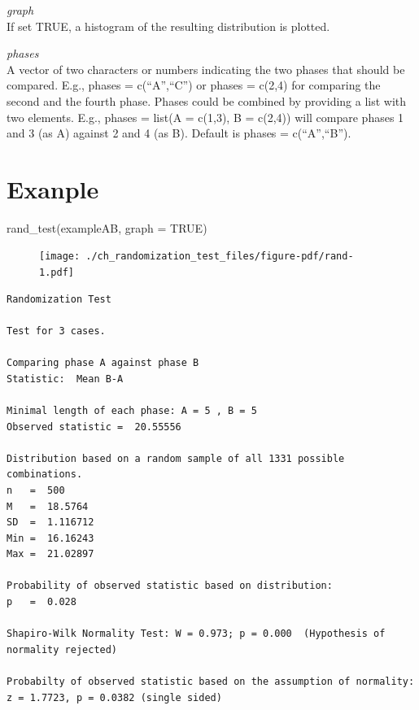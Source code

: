 \documentclass[
  letterpaper,
  DIV=11,
  numbers=noendperiod]{scrreprt}
\newenvironment{Shaded}{\begin{snugshade}}{\end{snugshade}}
\newcommand{\AttributeTok}[1]{\textcolor[rgb]{0.40,0.45,0.13}{#1}}
\newcommand{\ConstantTok}[1]{\textcolor[rgb]{0.56,0.35,0.01}{#1}}
\newcommand{\FunctionTok}[1]{\textcolor[rgb]{0.28,0.35,0.67}{#1}}
\newcommand{\NormalTok}[1]{\textcolor[rgb]{0.00,0.23,0.31}{#1}}
\begin{document}
\emph{graph}\\
If set TRUE, a histogram of the resulting distribution is plotted.

\emph{phases}\\
A vector of two characters or numbers indicating the two phases that
should be compared. E.g., phases = c(``A'',``C'') or phases = c(2,4) for
comparing the second and the fourth phase. Phases could be combined by
providing a list with two elements. E.g., phases = list(A = c(1,3), B =
c(2,4)) will compare phases 1 and 3 (as A) against 2 and 4 (as B).
Default is phases = c(``A'',``B'').

\hypertarget{exanple}{%
\section{Exanple}\label{exanple}}

\begin{Shaded}
\begin{Highlighting}[]
\FunctionTok{rand\_test}\NormalTok{(exampleAB, }\AttributeTok{graph =} \ConstantTok{TRUE}\NormalTok{)}
\end{Highlighting}
\end{Shaded}

\begin{figure}[H]

{\centering \texttt{[image: ./ch\_randomization\_test\_files/figure-pdf/rand-1.pdf]}

}

\end{figure}

\begin{verbatim}
Randomization Test

Test for 3 cases.

Comparing phase A against phase B 
Statistic:  Mean B-A 

Minimal length of each phase: A = 5 , B = 5 
Observed statistic =  20.55556 

Distribution based on a random sample of all 1331 possible combinations.
n   =  500 
M   =  18.5764 
SD  =  1.116712 
Min =  16.16243 
Max =  21.02897 

Probability of observed statistic based on distribution:
p   =  0.028 

Shapiro-Wilk Normality Test: W = 0.973; p = 0.000  (Hypothesis of normality rejected)

Probabilty of observed statistic based on the assumption of normality:
z = 1.7723, p = 0.0382 (single sided)
\end{verbatim}
\end{document}
